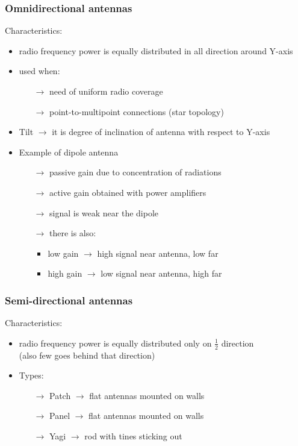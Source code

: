 \subsubsection{Omnidirectional antennas}

Characteristics:
\begin{itemize}
    \item radio frequency power is equally distributed in all direction around
    Y-axis
    \item used when:
    \begin{itemize}
        \item[$\rightarrow$] need of uniform radio coverage
        \item[$\rightarrow$] point-to-multipoint connections (star topology)
    \end{itemize}
    \item Tilt $\rightarrow$ it is degree of inclination of antenna with respect to Y-axis
    \item Example of dipole antenna
    \begin{itemize}
        \item[$\rightarrow$] passive gain due to concentration of radiations
        \item[$\rightarrow$] active gain obtained with power amplifiers
        \item[$\rightarrow$] signal is weak near the dipole
        \item[$\rightarrow$] there is also:
        \begin{itemize}
            \item low gain $\rightarrow$ high signal near antenna, low far
            \item high gain $\rightarrow$ low signal near antenna, high far
        \end{itemize}
    \end{itemize}
\end{itemize} 
\subsubsection{Semi-directional antennas}

Characteristics:
\begin{itemize}
    \item radio frequency power is equally distributed only on $\frac{1}{2}$ direction\\
    (also few goes behind that direction)
    \item Types:
    \begin{itemize}
        \item[$\rightarrow$] Patch $\rightarrow$ flat antennas mounted on walls
        \item[$\rightarrow$] Panel $\rightarrow$ flat antennas mounted on walls
        \item[$\rightarrow$] Yagi $\rightarrow$ rod with tines sticking out 
    \end{itemize}
\end{itemize}
